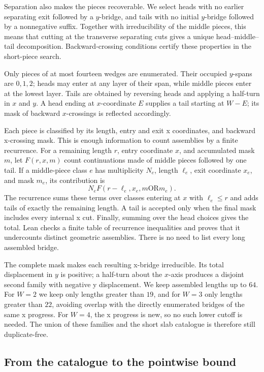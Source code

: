 \documentclass[11pt]{article}
\begin{document}
Separation also makes the pieces recoverable. We select heads with
no earlier separating exit followed by a $y$-bridge, and tails with
no initial $y$-bridge followed by a nonnegative suffix. Together with
irreducibility of the middle pieces, this means that cutting at
the transverse separating cuts gives a unique head--middle--tail
decomposition. Backward-crossing conditions certify these properties
in the short-piece search.

Only pieces of at most fourteen wedges are enumerated. Their occupied
$y$-spans are $0,1,2$; heads may enter at any layer of their span, while
middle pieces enter at the lowest layer. Tails are obtained by
reversing heads and applying a half-turn in $x$ and $y$. A head ending
at $x$-coordinate $E$ supplies a tail starting at $W-E$; its mask of
backward $x$-crossings is reflected accordingly.

Each piece is classified by its length, entry and exit x coordinates,
and backward x-crossing mask. This is enough information to count
assemblies by a finite recurrence. For a remaining length $r$,
entry coordinate $x$, and accumulated mask $m$, let $F(r,x,m)$
count continuations made of middle pieces followed by one tail.
If a middle-piece class $e$ has multiplicity $N_e$, length $\ell_e$,
exit coordinate $x_e$, and mask $m_e$, its contribution is
\[
 N_e F(r-\ell_e,x_e,m\mathbin{\mathrm{OR}}m_e).
\]
The recurrence sums these terms over classes entering at $x$ with
$\ell_e\leq r$ and adds tails of exactly the remaining length. A tail is accepted
only when the final mask includes every internal x cut.
Finally, summing over the head choices gives the total.
Lean checks a finite table of recurrence inequalities and proves
that it undercounts distinct geometric assemblies. There is no
need to list every long assembled bridge.

The complete mask makes each resulting x-bridge irreducible.
Its total displacement in $y$ is positive; a half-turn about the
$x$-axis produces
a disjoint second family with negative y displacement.
We keep assembled lengths up to $64$. For $W=2$ we keep only lengths
greater than $19$, and for $W=3$ only lengths greater than $22$,
avoiding overlap with the directly enumerated bridges of the same
x progress. For $W=4$, the x progress is new, so no such lower
cutoff is needed. The union of these families and the short slab
catalogue is therefore still duplicate-free.

\subsection{From the catalogue to the pointwise bound}
\end{document}
